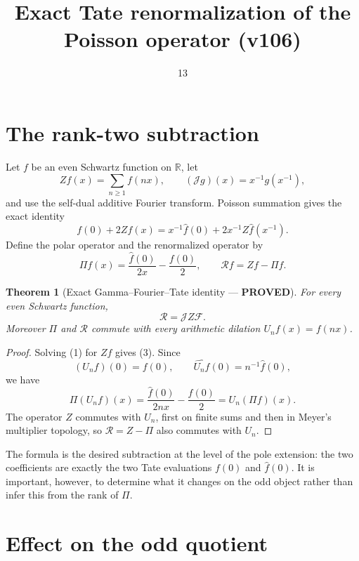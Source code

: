 \documentclass[11pt]{article}
\title{Exact Tate renormalization of the Poisson operator (v106)}
\date{13}
\newcommand{\PROVED}{\textcolor{green!40!black}{\textbf{PROVED}}}
\newtheorem{theorem}{Theorem}
\begin{document}
\maketitle

\section{The rank-two subtraction}

Let $f$ be an even Schwartz function on $\mathbb R$, let
\[
 Zf(x)=\sum_{n\geq1}f(nx),\qquad
 (\mathscr Jg)(x)=x^{-1}g(x^{-1}),
\]
and use the self-dual additive Fourier transform.  Poisson summation gives
the exact identity
\begin{equation}
 f(0)+2Zf(x)=x^{-1}\widehat f(0)
                 +2x^{-1}Z\widehat f(x^{-1}).                 \tag{1}
\end{equation}
Define the polar operator and the renormalized operator by
\begin{equation}
 \Pi f(x)=\frac{\widehat f(0)}{2x}-\frac{f(0)}2,
 \qquad \mathcal Rf=Zf-\Pi f.                                \tag{2}
\end{equation}

\begin{theorem}[Exact Gamma--Fourier--Tate identity --- \PROVED]
For every even Schwartz function,
\begin{equation}
                 \boxed{\mathcal R=\mathscr JZ\mathcal F}.   \tag{3}
\end{equation}
Moreover $\Pi$ and $\mathcal R$ commute with every arithmetic dilation
$U_nf(x)=f(nx)$.
\end{theorem}

\begin{proof}
Solving (1) for $Zf$ gives (3).  Since
\[
 (U_nf)(0)=f(0),\qquad \widehat{U_nf}(0)=n^{-1}\widehat f(0),
\]
we have
\[
 \Pi(U_nf)(x)=\frac{\widehat f(0)}{2nx}-\frac{f(0)}2
             =U_n(\Pi f)(x).
\]
The operator $Z$ commutes with $U_n$, first on finite sums and then in
Meyer's multiplier topology, so $\mathcal R=Z-\Pi$ also commutes with
$U_n$.
\end{proof}

The formula is the desired subtraction at the level of the pole extension:
the two coefficients are exactly the two Tate evaluations $f(0)$ and
$\widehat f(0)$.  It is important, however, to determine what it changes
on the odd object rather than infer this from the rank of $\Pi$.

\section{Effect on the odd quotient}
\end{document}
